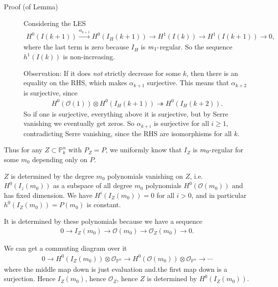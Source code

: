 \begin{description}
\item[Proof (of Lemma)]
Considering the LES
\begin{align*}
H^0(I(k+1)) \xrightarrow{\alpha_{k+1}} H^0(I_H(k+1)) \to H^1(I(k)) \to H^1(I(k+1)) \to 0
,\end{align*}
where the last term is zero because \(I_H\) is \(m_1{\hbox{-}}\)regular.
So the sequence \(h^1(I(k))\) is non-increasing.

Observation: If it does \emph{not} strictly decrease for some \(k\),
then there is an equality on the RHS, which makes \(\alpha_{k+1}\)
surjective. This means that \(\alpha_{k+2}\) is surjective, since
\begin{align*}
H^0({\mathcal{O}}(1)) \otimes H^0(I_H(k+1)) \twoheadrightarrow H^0(I_H(k+2))
.\end{align*}
So if one is surjective, everything above it is surjective, but by Serre
vanishing we eventually get zeros. So \(\alpha_{k+i}\) is surjective for
all \(i\geq 1\), contradicting Serre vanishing, since the RHS are
isomorphisms for all \(k\).
\end{description}

Thus for any \(Z\subset {\mathbb{P}}^n_k\) with \(P_Z = P\), we
uniformly know that \(I_Z\) is \(m_0{\hbox{-}}\)regular for some \(m_0\)
depending only on \(P\).

\begin{description}
\tightlist
\item[Claim]
\(Z\) is determined by the degree \(m_0\) polynomials vanishing on
\(Z\), i.e.~\(H^0(I_z(m_0))\) as a subspace of all degree \(m_0\)
polynomials \(H^0({\mathcal{O}}(m_0))\) and has fixed dimension. We have
\(H^i(I_Z(m_0)) = 0\) for all \(i> 0\), and in particular
\(h^0(I_Z(m_0)) = P(m_0)\) is constant.
\end{description}

It is determined by these polynomials because we have a sequence
\begin{align*} 0 \to I_Z(m_0) \to {\mathcal{O}}(m_0) \to {\mathcal{O}}_Z(m_0) \to 0 .\end{align*}

We can get a commuting diagram over it
\begin{align*}
0 \to H^0(I_Z(m_0)) \otimes{\mathcal{O}}_{{\mathbb{P}}^n} \to H^0({\mathcal{O}}(m_0)) \otimes{\mathcal{O}}_{{\mathbb{P}}^n} \to \cdots
\end{align*}
where the middle map down is just evaluation and.the first map down is a
surjection. Hence \(I_Z(m_0)\), hence \({\mathcal{O}}_Z\), hence \(Z\)
is determined by \(H^0(I_Z(m_0))\).

